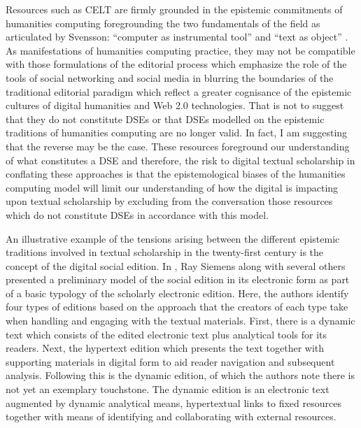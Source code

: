 \begin{paper}
Resources such as CELT are firmly grounded in the epistemic commitments of humanities computing foregrounding the two fundamentals of the field as articulated by Svensson: ``computer as instrumental tool'' and ``text as object'' \citeyearpar{svensson_humanities_2009}. As manifestations of humanities computing practice, they may not be compatible with those formulations of the editorial process which emphasize the role of the tools of social networking and social media in blurring the boundaries of the traditional editorial paradigm which reflect a greater cognisance of the epistemic cultures of digital humanities and Web 2.0 technologies. That is not to suggest that they do not constitute DSEs or that DSEs modelled on the epistemic traditions of humanities computing are no longer valid. In fact, I am suggesting that the reverse may be the case. These resources foreground our understanding of what constitutes a DSE and therefore, the risk to digital textual scholarship in conflating these approaches is that the epistemological biases of the humanities computing model will limit our understanding of how the digital is impacting upon textual scholarship by excluding from the conversation those resources which do not constitute DSEs in accordance with this model. 

An illustrative example of the tensions arising between the different epistemic traditions involved in textual scholarship in the twenty-first century is the concept of the digital social edition. In \citeyear{siemens_modeling_2012}, Ray Siemens along with several others presented a preliminary model of the social edition in its electronic form as part of a basic typology of the scholarly electronic edition. Here, the authors identify four types of editions based on the approach that the creators of each type take when handling and engaging with the textual materials. First, there is a dynamic text which consists of the edited electronic text plus analytical tools for its readers. Next, the hypertext edition which presents the text together with supporting materials in digital form to aid reader navigation and subsequent analysis. Following this is the dynamic edition, of which the authors note there is not yet an exemplary touchstone. The dynamic edition is an electronic text augmented by dynamic analytical means, hypertextual links to fixed resources together with means of identifying and collaborating with external resources. 


\end{paper}
